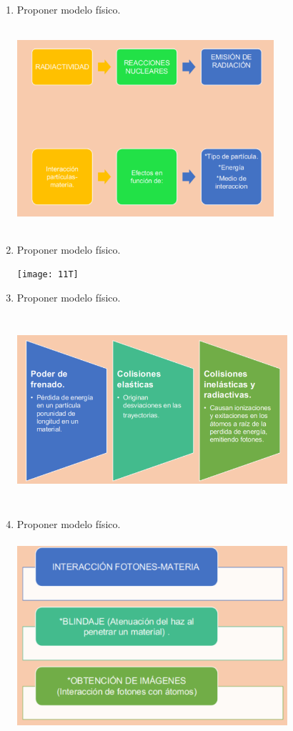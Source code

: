 \documentclass{beamer}
\begin{document}
\begin{enumerate}
\newpage
 \item Proponer modelo físico. 
\begin{center}
\includegraphics[width=9.5cm,height=7.5cm]{10T}
\end{center}
\newpage
 \item Proponer modelo físico.
\begin{center}
\texttt{[image: 11T]}
\end{center}
\newpage
 \item Proponer modelo físico.
\begin{center}
\includegraphics[width=10cm,height=7cm]{12T}
\end{center}
\newpage
 \item Proponer modelo físico.
 \begin{center}
\includegraphics[width=10cm,height=7cm]{13T}

\end{center}
\end{enumerate}
\end{document}
